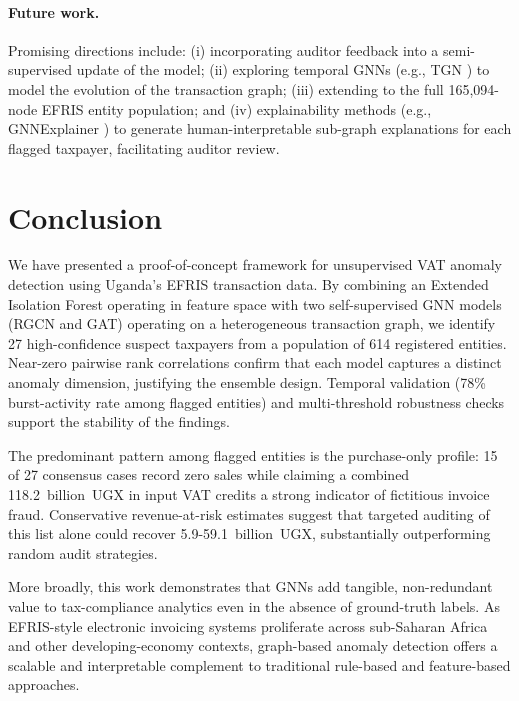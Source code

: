 \documentclass[10pt,twocolumn]{article}
\begin{document}
\paragraph{Future work.} Promising directions include: (i) incorporating
auditor feedback into a semi-supervised update of the model; (ii) exploring
temporal GNNs (e.g., TGN \cite{rossi2020temporal}) to model the evolution of
the transaction graph; (iii) extending to the full 165,094-node EFRIS entity
population; and (iv) explainability methods (e.g., GNNExplainer
\cite{ying2019gnnexplainer}) to generate human-interpretable sub-graph
explanations for each flagged taxpayer, facilitating auditor review.

\section{Conclusion}
\label{sec:conclusion}

We have presented a proof-of-concept framework for unsupervised VAT anomaly
detection using Uganda's EFRIS transaction data. By combining an Extended
Isolation Forest operating in feature space with two self-supervised GNN models
(RGCN and GAT) operating on a heterogeneous transaction graph, we identify 27
high-confidence suspect taxpayers from a population of 614 registered entities.
Near-zero pairwise rank correlations confirm that each model captures a distinct
anomaly dimension, justifying the ensemble design. Temporal validation (78\%
burst-activity rate among flagged entities) and multi-threshold robustness checks
support the stability of the findings.

The predominant pattern among flagged entities is the purchase-only profile:
15 of 27 consensus cases record zero sales while claiming a combined
118.2~billion~UGX in input VAT credits a strong indicator of fictitious
invoice fraud. Conservative revenue-at-risk estimates suggest that targeted
auditing of this list alone could recover 5.9-59.1~billion~UGX, substantially
outperforming random audit strategies.

More broadly, this work demonstrates that GNNs add tangible, non-redundant
value to tax-compliance analytics even in the absence of ground-truth labels.
As EFRIS-style electronic invoicing systems proliferate across sub-Saharan
Africa and other developing-economy contexts, graph-based anomaly detection
offers a scalable and interpretable complement to traditional rule-based and
feature-based approaches.


\end{document}
